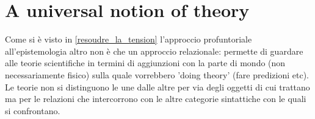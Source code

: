 \section{A universal notion of theory} 


Come si è visto in \autoref{resoudre_la_tension} l'approccio profuntoriale all'epistemologia altro non è che un approccio relazionale: permette di guardare alle teorie scientifiche in termini di aggiunzioni con la parte di mondo (non necessariamente fisico) sulla quale vorrebbero 'doing theory' (fare predizioni etc). Le teorie non si distinguono le une dalle altre per via degli oggetti di cui trattano ma per le relazioni che intercorrono con le altre categorie sintattiche con le quali si confrontano. 

